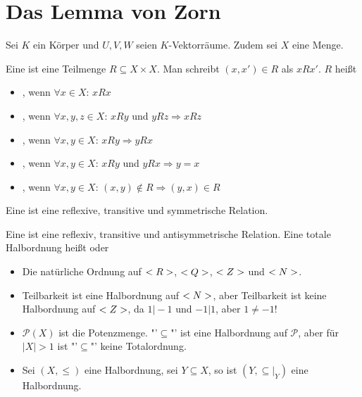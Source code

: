 \section{Das Lemma von Zorn}

Sei $K$ ein Körper und $U,V,W$ seien $K$-Vektorräume. Zudem sei $X$ eine Menge.

\begin{definition}[Relation]
	Eine  ist eine Teilmenge $R\subseteq X\times X$. Man schreibt $(x,x')\in R$ als $xRx'$. $R$ heißt
	\begin{itemize}
		\item {}, wenn $\forall  x\in X$: $xRx$
		\item {}, wenn $\forall x,y,z\in X$: $xRy$ und $yRz\Rightarrow xRz$
		\item {}, wenn $\forall x,y\in X$: $xRy\Rightarrow yRx$
		\item {}, wenn $\forall x,y\in X$: $xRy$ und $yRx\Rightarrow y=x$
		\item {}, wenn $\forall x,y\in X$: $(x,y)\notin R\Rightarrow (y,x)\in R$
	\end{itemize}
\end{definition}

\begin{definition}[Äquivalenzrelation]
	Eine  ist eine reflexive, transitive und symmetrische Relation.
\end{definition}

\begin{definition}[Halbordnung]
	Eine  ist eine reflexiv, transitive und antisymmetrische Relation. Eine totale Halbordnung heißt  oder 
\end{definition}

\begin{example}
	\begin{itemize}
		\item Die natürliche Ordnung auf $<R>$, $<Q>$, $<Z>$ und $<N>$.
		\item Teilbarkeit ist eine Halbordnung auf $<N>$, aber Teilbarkeit ist keine Halbordnung auf $<Z>$, da $1\vert -1$ und $-1\vert 1$, aber $1\neq -1$!
		\item $\mathcal{P}(X)$ ist die Potenzmenge. "'$\subseteq$"' ist eine Halbordnung auf $\mathcal{P}$, aber für $\vert X\vert>1$ ist "'$\subseteq$"' keine Totalordnung.
		\item Sei $(X,\le)$ eine Halbordnung, sei $Y\subseteq X$, so ist $(Y,\subseteq\vert_Y)$ eine Halbordnung.
	\end{itemize}
\end{example}

